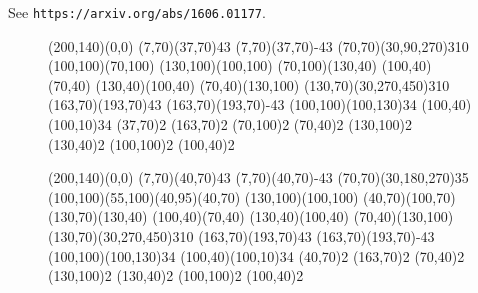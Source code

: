\documentclass{article}
\begin{document}
See \texttt{https://arxiv.org/abs/1606.01177}.
\begin{figure}
  \centering
  \begin{axopicture}(200,140)(0,0)
    \Photon(7,70)(37,70){4}{3}
    \Photon(7,70)(37,70){-4}{3}
    \GluonArc(70,70)(30,90,270){3}{10}
    \Line[arrow](100,100)(70,100)
    \Line[arrow](130,100)(100,100)
    \Line[arrow,arrowpos=0.25](70,100)(130,40)
    \Line[arrow](100,40)(70,40)
    \Line[arrow](130,40)(100,40)
    \Line[arrow,arrowpos=0.75](70,40)(130,100)
    \GluonArc(130,70)(30,270,450){3}{10}
    \Photon(163,70)(193,70){4}{3}
    \Photon(163,70)(193,70){-4}{3}
    \Gluon(100,100)(100,130){3}{4}
    \Gluon(100,40)(100,10){3}{4}
    \Vertex(37,70){2}
    \Vertex(163,70){2}
    \Vertex(70,100){2}
    \Vertex(70,40){2}
    \Vertex(130,100){2}
    \Vertex(130,40){2}
    \Vertex(100,100){2}
    \Vertex(100,40){2}
  \end{axopicture}

  \begin{axopicture}(200,140)(0,0)
    \Photon(7,70)(40,70){4}{3}
    \Photon(7,70)(40,70){-4}{3}
    \GluonArc(70,70)(30,180,270){3}{5}
    \Bezier[arrow](100,100)(55,100)(40,95)(40,70)
    \Line[arrow](130,100)(100,100)
    \Bezier[arrow,arrowpos=0.37](40,70)(100,70)(130,70)(130,40)
    \Line[arrow](100,40)(70,40)
    \Line[arrow](130,40)(100,40)
    \Line[arrow,arrowpos=0.75](70,40)(130,100)
    \GluonArc(130,70)(30,270,450){3}{10}
    \Photon(163,70)(193,70){4}{3}
    \Photon(163,70)(193,70){-4}{3}
    \Gluon(100,100)(100,130){3}{4}
    \Gluon(100,40)(100,10){3}{4}
    \Vertex(40,70){2}
    \Vertex(163,70){2}
    \Vertex(70,40){2}
    \Vertex(130,100){2}
    \Vertex(130,40){2}
    \Vertex(100,100){2}
    \Vertex(100,40){2}
  \end{axopicture}
\end{figure}
\end{document}
